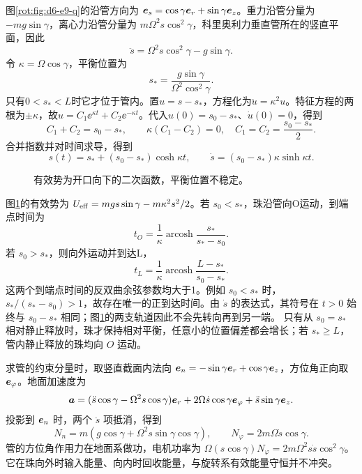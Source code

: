 \begin{solution}
图\ref{rot:fig:d6-e9-q}的沿管方向为
$\bm{e}_s=\cos\gamma\bm{e}_r+\sin\gamma\bm{e}_z$。重力沿管分量为 $-mg\sin\gamma$，离心力沿管分量为 $m\Omega^2s\cos^2\gamma$，科里奥利力垂直管所在的竖直平面，因此
\[
\ddot s=\Omega^2s\cos^2\gamma-g\sin\gamma.
\]
令 $\kappa=\Omega\cos\gamma$，平衡位置为
\[
s_* =\frac{g\sin\gamma}{\Omega^2\cos^2\gamma}.
\]
只有$0<s_*<L$时它才位于管内。置$u=s-s_*$，方程化为$\ddot u=\kappa^2u$。特征方程的两根为$\pm\kappa$，故$u=C_1\ee^{\kappa t}+C_2\ee^{-\kappa t}$。代入$u(0)=s_0-s_*$、$\dot u(0)=0$，得到
\[
C_1+C_2=s_0-s_*,\qquad \kappa(C_1-C_2)=0,
\quad C_1=C_2=\frac{s_0-s_*}{2}.
\]
合并指数并对时间求导，得到
\[
s(t)=s_*+(s_0-s_*)\cosh\kappa t,
\qquad \dot s=(s_0-s_*)\kappa\sinh\kappa t.
\]
\begin{figure}[H]\centering
{}
\caption{有效势为开口向下的二次函数，平衡位置不稳定。}\label{rot:fig:d6-e9-s}
\end{figure}
图\ref{rot:fig:d6-e9-s}的有效势为
$U_{\rm eff}=mgs\sin\gamma-m\kappa^2s^2/2$。若 $s_0<s_*$，珠沿管向O运动，到端点时间为
\[
t_O=\frac1\kappa\operatorname{arcosh}\frac{s_*}{s_*-s_0}.
\]
若 $s_0>s_*$，则向外运动并到达L，
\[
t_L=\frac1\kappa\operatorname{arcosh}\frac{L-s_*}{s_0-s_*}.
\]
这两个到端点时间的反双曲余弦参数均大于1。例如 $s_0<s_*$ 时，$s_*/(s_*-s_0)>1$，故存在唯一的正到达时间。由 $\dot s$ 的表达式，其符号在 $t>0$ 始终与 $s_0-s_*$ 相同；图\ref{rot:fig:d6-e9-s}的两支轨道因此不会先转向再到另一端。
只有从 $s_0=s_*$ 相对静止释放时，珠才保持相对平衡，任意小的位置偏差都会增长；若 $s_*\ge L$，管内静止释放的珠均向 $O$ 运动。

求管的约束分量时，取竖直截面内法向
$\bm{e}_n=-\sin\gamma\bm{e}_r+\cos\gamma\bm{e}_z$，方位角正向取 $\bm{e}_\varphi$。地面加速度为
\[
\bm{a}=(\ddot s\cos\gamma-\Omega^2s\cos\gamma)\bm{e}_r
+2\Omega\dot s\cos\gamma\bm{e}_\varphi
+\ddot s\sin\gamma\bm{e}_z.
\]
投影到 $\bm{e}_n$ 时，两个 $\ddot s$ 项抵消，得到
\[
N_n=m(g\cos\gamma+\Omega^2s\sin\gamma\cos\gamma),
\qquad N_\varphi=2m\Omega\dot s\cos\gamma.
\]
管的方位角作用力在地面系做功，电机功率为
$\Omega(s\cos\gamma)N_\varphi=2m\Omega^2s\dot s\cos^2\gamma$。它在珠向外时输入能量、向内时回收能量，与旋转系有效能量守恒并不冲突。
\end{solution}



